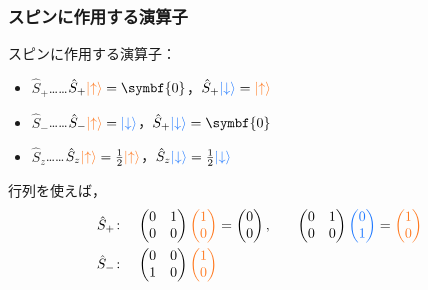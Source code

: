 \documentclass[
    10pt,
    ]{sotsu-beamer}
\newcommand{\upspin}{\mathcolor{red}{\ket{\uparrow}}}
\newcommand{\dwspin}{\mathcolor{blue}{\ket{\downarrow}}}
\begin{document}
\begin{frame}
    \frametitle{スピンに作用する演算子}

    スピンに作用する演算子：
    \begin{itemize}
        \item $\hat{S}_+$……$\hat{S}_+ \upspin = \symbf{0}$，$\hat{S}_+ \dwspin = \upspin$
        \item $\hat{S}_-$……$\hat{S}_- \upspin = \dwspin$，$\hat{S}_+ \dwspin = \symbf{0}$
        \item $\hat{S}_z$……$\hat{S}_z \upspin = \frac{1}{2} \upspin$，$\hat{S}_z \dwspin = \frac{1}{2} \dwspin$
    \end{itemize}

    \pause

    行列を使えば，
    \begin{alignat*}{3}
        \hat{S}_+ &\colon 
        &
        \begin{pmatrix}
            0 & 1 \\
            0 & 0
        \end{pmatrix}
        \mathcolor{red}{ \begin{pmatrix} 1 \\ 0 \end{pmatrix} }
        &= 
        \mathcolor{black}{ \begin{pmatrix} 0 \\ 0 \end{pmatrix} }
        , \quad
        &
        \begin{pmatrix}
            0 & 1 \\
            0 & 0
        \end{pmatrix}
        \mathcolor{blue}{ \begin{pmatrix} 0 \\ 1 \end{pmatrix} }
        &= 
        \mathcolor{red}{ \begin{pmatrix} 1 \\ 0 \end{pmatrix} }
        \\
        \hat{S}_- &\colon 
        &
        \begin{pmatrix}
            0 & 0 \\
            1 & 0
        \end{pmatrix}
        \mathcolor{red}{ \begin{pmatrix} 1 \\ 0 \end{pmatrix} }

\end{alignat*}
\end{frame}
\end{document}
